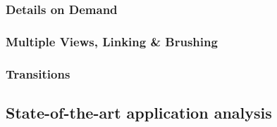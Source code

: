 \subsubsection{Details on Demand}

\subsubsection{Multiple Views, Linking \& Brushing}

\subsubsection{Transitions}

\subsection{State-of-the-art application analysis}





